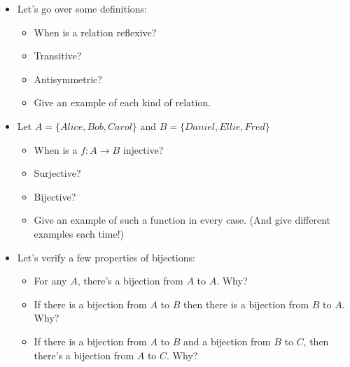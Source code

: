 \documentclass[justified]{tufte-handout}
\begin{document}
\begin{itemize}

\item Let's go over some definitions: 



\begin{itemize}

\item When is a relation reflexive? 


\item Transitive? 


\item Antisymmetric? 


\item Give an example of each kind of relation.

\end{itemize}




\item Let $A =\{Alice, Bob, Carol\}$ and $B=\{Daniel, Ellie, Fred\}$


\begin{itemize}

\item When is a $f: A\rightarrow B$ injective? 

\item Surjective?

\item Bijective?

\item Give an example of such a function in every case. (And give different examples each time!)

\end{itemize}


\item Let's verify a few properties of bijections: 


\begin{itemize}

\item For any $A$, there's a bijection from $A$ to $A$. Why?

\item If there is a bijection from $A$ to $B$ then there is a bijection from $B$ to $A$. Why?

\item If there is a bijection from $A$ to $B$ and a bijection from $B$ to $C$, then there's a bijection from $A$ to $C$. Why?


\end{itemize}


\end{itemize}
\end{document}
